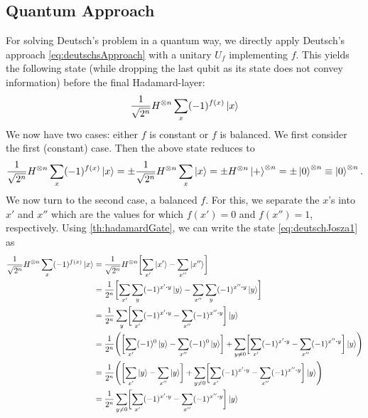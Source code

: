 		\subsection{Quantum Approach}
			For solving Deutsch's problem in a quantum way, we directly apply Deutsch's approach \eqref{eq:deutschsApproach} with a unitary \(U_f\) implementing \(f\). This yields the following state (while dropping the last qubit as its state does not convey information) before the final Hadamard-layer:
			\begin{equation}
				\frac{1}{\sqrt{2^n}} H^{\otimes n} \sum_x (-1)^{f(x)} \ket{x}  \label{eq:deutschJosza1}
			\end{equation}
			We now have two cases: either \(f\) is constant or \(f\) is balanced. We first consider the first (constant) case. Then the above state reduces to
			\begin{equation}
				\frac{1}{\sqrt{2^n}} H^{\otimes n} \sum_x (-1)^{f(x)} \ket{x}
					= \pm \frac{1}{\sqrt{2^n}} H^{\otimes n} \sum_x \ket{x}
					= \pm H^{\otimes n} \ket{+}^{\otimes n}
					= \pm \ket{0}^{\otimes n}
					\equiv \ket{0}^{\otimes n}.
			\end{equation}
			We now turn to the second case, a balanced \(f\). For this, we separate the \(x\)'s into \(x'\) and \(x''\) which are the values for which \(f(x') = 0\) and \(f(x'') = 1\), respectively. Using \eqref{th:hadamardGate}, we can write the state \eqref{eq:deutschJosza1} as
			\begin{align}
				\frac{1}{\sqrt{2^n}} H^{\otimes n} \sum_x (-1)^{f(x)} \ket{x}
					&= \frac{1}{\sqrt{2^n}} H^{\otimes n} \biggl[ \sum_{x'} \ket{x'} - \sum_{x''} \ket{x''} \biggr] \\
					&= \frac{1}{2^n} \biggl[ \sum_{x'} \sum_y (-1)^{x' \dotproduct y} \ket{y} - \sum_{x''} \sum_y (-1)^{x'' \dotproduct y} \ket{y} \biggr] \\
					&= \frac{1}{2^n} \sum_y \biggl[ \sum_{x'} (-1)^{x' \dotproduct y} - \sum_{x''} (-1)^{x'' \dotproduct y} \biggr] \ket{y} \\
					&= \frac{1}{2^n} \Biggl( \biggl[ \sum_{x'} (-1)^{0} \ket{y} - \sum_{x''} (-1)^{0} \ket{y} \biggr] + \sum_{y \neq 0} \biggl[ \sum_{x'} (-1)^{x' \dotproduct y} - \sum_{x''} (-1)^{x'' \dotproduct y} \biggr] \ket{y} \Biggr) \\
					&= \frac{1}{2^n} \Biggl( \biggl[ \sum_{x'} \ket{y} - \sum_{x''} \ket{y} \biggr] + \sum_{y \neq 0} \biggl[ \sum_{x'} (-1)^{x' \dotproduct y} - \sum_{x''} (-1)^{x'' \dotproduct y} \biggr] \ket{y} \Biggr) \\
					&= \frac{1}{2^n} \sum_{y \neq 0} \biggl[ \sum_{x'} (-1)^{x' \dotproduct y} - \sum_{x''} (-1)^{x'' \dotproduct y} \biggr] \ket{y}
			\end{align}
